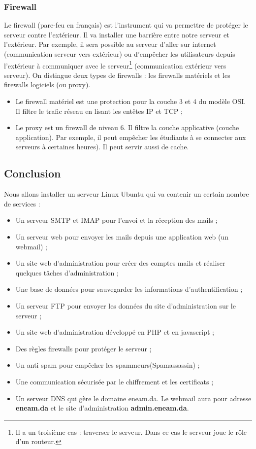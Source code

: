 \documentclass[a4paper,12pt,french]{report} %
\begin{document}
\subsubsection{Firewall}
Le firewall (pare-feu en français) est l'instrument qui va permettre de protéger le serveur contre l'extérieur. Il va installer une barrière entre notre serveur et l'extérieur. Par exemple, il sera possible au serveur d'aller sur internet (communication serveur vers extérieur) ou d'empêcher les utilisateurs depuis l'extérieur à communiquer avec le serveur\footnote{Il a un troisième cas : traverser le serveur. Dans ce cas le serveur joue le rôle d'un routeur.} (communication extérieur vers serveur). On distingue deux types de firewalls : les firewalls matériels et les firewalls logiciels (ou proxy).
\begin{itemize}
\item Le firewall matériel est une protection pour la couche 3 et 4 du modèle OSI. Il filtre le trafic réseau en lisant les entêtes IP et TCP ;
\item Le proxy est un firewall de niveau 6. Il filtre la couche applicative (couche application). Par exemple, il peut empêcher les étudiants à se connecter aux serveurs à certaines heures). Il peut servir aussi de cache.
\end{itemize}

\subsection*{Conclusion}
Nous allons installer un serveur Linux Ubuntu qui va contenir un certain nombre de services :
\begin{itemize}
	\item  Un serveur SMTP et IMAP pour l'envoi et la réception des mails ;
	\item  Un serveur web pour envoyer les mails depuis une application web (un webmail) ;
	\item  Un site web d'administration pour créer des comptes mails et réaliser quelques tâches d'administration ;
	\item Une base de données pour sauvegarder les informations d'authentification ; 
	\item Un serveur FTP pour envoyer les données du site d'administration sur le serveur ;
	\item Un site web d'administration développé en PHP et en javascript ; 
	\item Des règles firewalls pour protéger le serveur ; 
	\item Un anti spam pour empêcher les spammeurs(Spamassassin) ;
	\item Une communication sécurisée par le chiffrement et les certificats ;
	\item Un serveur DNS qui gère le domaine eneam.da. Le webmail aura pour adresse \textbf{eneam.da} et le site d'administration \textbf{admin.eneam.da}.
\end{itemize}
\end{document}
